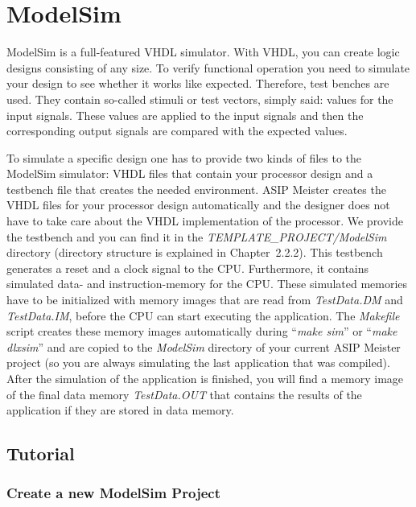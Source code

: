 \documentclass[
]{article}
\author{}
\date{}
\begin{document}
\hypertarget{modelsim}{%
\section{ModelSim}\label{modelsim}}

ModelSim is a full-featured VHDL simulator. With VHDL, you can create
logic designs consisting of any size. To verify functional operation you
need to simulate your design to see whether it works like expected.
Therefore, test benches are used. They contain so-called stimuli or test
vectors, simply said: values for the input signals. These values are
applied to the input signals and then the corresponding output signals
are compared with the expected values.

To simulate a specific design one has to provide two kinds of files to
the ModelSim simulator: VHDL files that contain your processor design
and a testbench file that creates the needed environment. ASIP Meister
creates the VHDL files for your processor design automatically and the
designer does not have to take care about the VHDL implementation of the
processor. We provide the testbench and you can find it in the
\emph{TEM­PLATE\_­PRO­JECT/ModelSim} directory (directory structure is
explained in Chapter~2.2.2). This testbench generates a reset and a
clock signal to the CPU. Furthermore, it contains simulated data- and
instruction-memory for the CPU. These simulated memories have to be
initialized with memory images that are read from \emph{TestData.DM} and
\emph{TestData.IM}, before the CPU can start executing the application.
The \emph{Makefile} script creates these memory images automatically
during ``\emph{make sim}'' or ``\emph{make dlxsim}'' and are copied to
the \emph{ModelSim} directory of your current ASIP Meister project (so
you are always simulating the last application that was compiled). After
the simulation of the application is finished, you will find a memory
image of the final data memory \emph{TestData.OUT} that contains the
results of the application if they are stored in data memory.

\hypertarget{tutorial}{%
\subsection{Tutorial}\label{tutorial}}

\hypertarget{create-a-new-modelsim-project}{%
\subsubsection{Create a new ModelSim
Project}\label{create-a-new-modelsim-project}}
\end{document}
